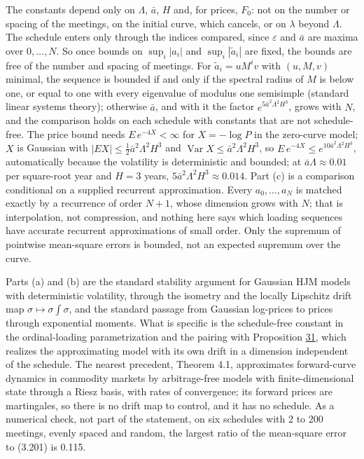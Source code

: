 \documentclass[11pt]{article}
\begin{document}
The constants depend only on \(\Lambda\), \(\bar a\), \(H\) and, for prices, \(F_0\): not on the number or spacing of the meetings, on the initial curve, which cancels, or on \(\lambda\) beyond \(\Lambda\). The schedule enters only through the indices compared, since \(\varepsilon\) and \(\bar a\) are maxima over \(0,\dots,N\). So once bounds on \(\sup_i|a_i|\) and \(\sup_i|\tilde a_i|\) are fixed, the bounds are free of the number and spacing of meetings. For \(\tilde a_i=uM^iv\) with \((u,M,v)\) minimal, the sequence is bounded if and only if the spectral radius of \(M\) is below one, or equal to one with every eigenvalue of modulus one semisimple (standard linear systems theory); otherwise \(\bar a\), and with it the factor \(e^{5\bar a^2\Lambda^2H^3}\), grows with \(N\), and the comparison holds on each schedule with constants that are not schedule-free. The price bound needs \(E\,e^{-4X}<\infty\) for \(X=-\log P\) in the zero-curve model; \(X\) is Gaussian with \(|EX|\le\frac12\bar a^2\Lambda^2H^3\) and \(\operatorname{Var}X\le\bar a^2\Lambda^2H^3\), so \(E\,e^{-4X}\le e^{10\bar a^2\Lambda^2H^3}\), automatically because the volatility is deterministic and bounded; at \(\bar a\Lambda\approx0.01\) per square-root year and \(H=3\) years, \(5\bar a^2\Lambda^2H^3\approx0.014\). Part (c) is a comparison conditional on a supplied recurrent approximation. Every \(a_0,\dots,a_N\) is matched exactly by a recurrence of order \(N+1\), whose dimension grows with \(N\); that is interpolation, not compression, and nothing here says which loading sequences have accurate recurrent approximations of small order. Only the supremum of pointwise mean-square errors is bounded, not an expected supremum over the curve.

Parts (a) and (b) are the standard stability argument for Gaussian HJM models with deterministic volatility, through the isometry and the locally Lipschitz drift map \(\sigma\mapsto\sigma\int\sigma\), and the standard passage from Gaussian log-prices to prices through exponential moments. What is specific is the schedule-free constant in the ordinal-loading parametrization and the pairing with Proposition \hyperref[res:Proposition-31]{31}, which realizes the approximating model with its own drift in a dimension independent of the schedule. The nearest precedent, \cite{benth2018approximation} Theorem 4.1, approximates forward-curve dynamics in commodity markets by arbitrage-free models with finite-dimensional state through a Riesz basis, with rates of convergence; its forward prices are martingales, so there is no drift map to control, and it has no schedule. As a numerical check, not part of the statement, on six schedules with 2 to 200 meetings, evenly spaced and random, the largest ratio of the mean-square error to (3.201) is 0.115.
\end{document}
